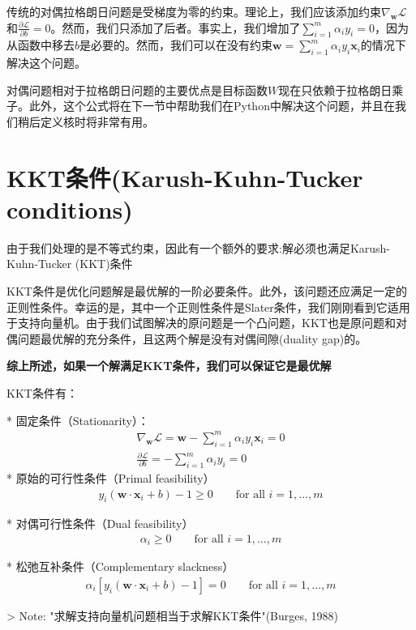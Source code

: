 传统的对偶拉格朗日问题是受梯度为零的约束。理论上，我们应该添加约束$\nabla_\mathbf{w}\mathcal{L}$和$\frac{\partial \mathcal{L}}{\partial b}= 0$。然而，我们只添加了后者。事实上，我们增加了$\sum\limits_{i=1}^m\alpha_i y_i = 0$，因为从函数中移去$b$是必要的。然而，我们可以在没有约束$\mathbf{w}=\sum\limits_{i=1}^m \alpha_i y_i \mathbf{x}_i$的情况下解决这个问题。

对偶问题相对于拉格朗日问题的主要优点是目标函数$W$现在只依赖于拉格朗日乘子。此外，这个公式将在下一节中帮助我们在Python中解决这个问题，并且在我们稍后定义核时将非常有用。

\section{KKT条件(Karush-Kuhn-Tucker conditions)}
由于我们处理的是不等式约束，因此有一个额外的要求:解必须也满足Karush-Kuhn-Tucker (KKT)条件

KKT条件是优化问题解是最优解的一阶必要条件。此外，该问题还应满足一定的正则性条件。幸运的是，其中一个正则性条件是Slater条件，我们刚刚看到它适用于支持向量机。由于我们试图解决的原问题是一个凸问题，KKT也是原问题和对偶问题最优解的充分条件，且这两个解是没有对偶间隙(duality gap)的。

\textbf{综上所述，如果一个解满足KKT条件，我们可以保证它是最优解}

KKT条件有：

* 固定条件（Stationarity）：
\begin{gather*}
\nabla_\mathbf{w} \mathcal{L} = \mathbf{w} - \sum_{i=1}^m \alpha_i y_i \mathbf{x}_i = 0 \\
\frac{\partial \mathcal{L}}{\partial b}=-\sum_{i=1}^m\alpha_i y_i = 0
\end{gather*}
* 原始的可行性条件（Primal feasibility）
\begin{gather*}
y_i (\mathbf{w} \cdot \mathbf{x}_i + b) -1 \geq 0 \qquad \text{for all }i=1,\dots,m
\end{gather*}

* 对偶可行性条件（Dual feasibility）
\begin{gather*}
\alpha_i \geq 0 \qquad \text{for all }i=1,\dots,m
\end{gather*}

* 松弛互补条件（Complementary slackness）
\begin{gather*}
\alpha_i[y_i (\mathbf{w} \cdot \mathbf{x}_i + b) -1] =0 \qquad \text{for all }i=1,\dots,m
\end{gather*}

> Note: "求解支持向量机问题相当于求解KKT条件"(Burges, 1988)

